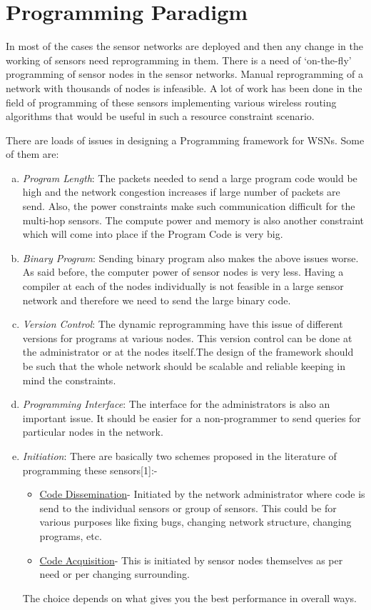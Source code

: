 \documentclass[twocolumn]{article}
\begin{document}
\section{Programming Paradigm}

In most of the cases the sensor networks are deployed and then any change in the working of sensors need reprogramming in them. There is a need of ‘on-the-fly’ programming of sensor nodes in the sensor networks. Manual reprogramming of a network with thousands of nodes is infeasible. A lot of work has been done in the field of programming of these sensors implementing various wireless routing algorithms that would be useful in such a resource constraint scenario.

There are loads of issues in designing a Programming framework for WSNs. Some of them are:
\begin{enumerate}[a)]
\item \emph{Program Length}: The packets needed to send a large program code would be high and the network congestion increases if large number of packets are send. Also, the power constraints make such communication difficult for the multi-hop sensors. The compute power and memory is also another constraint which will come into place if the Program Code is very big.

\item \emph{Binary Program}: Sending binary program also makes the above issues worse. As said before, the computer power of sensor nodes is very less. Having a compiler at each of the nodes individually is not feasible in a large sensor network and therefore we need to send the large binary code.

\item \emph{Version Control}: The dynamic reprogramming have this issue of different versions for programs at various nodes. This version control can be done at the administrator or at the nodes itself.The design of the framework should be such that the whole network should be scalable and reliable keeping in mind the constraints.

\item \emph{Programming Interface}: The interface for the administrators is also an important issue. It should be easier for a non-programmer to send queries for particular nodes in the network.

\item \emph{Initiation}: There are basically two schemes proposed in the literature of programming these sensors[1]:-
\begin{itemize}
\item \underline{Code Dissemination}- Initiated by the network administrator where code is send to the individual sensors or group of sensors. This could be for various purposes like fixing bugs, changing network structure, changing programs, etc.

\item \underline{Code Acquisition}- This is initiated by sensor nodes themselves as per need or per changing surrounding.
\end{itemize}

The choice depends on what gives you the best performance in overall ways.
\end{enumerate}
\end{document}
